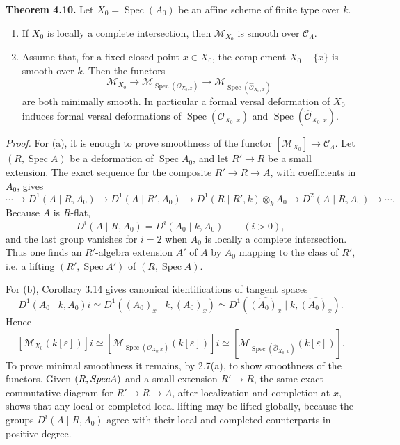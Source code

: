 \documentclass[11pt]{article}
\providecommand{\Spec}{\operatorname{Spec}}
\begin{document}
\textbf{Theorem 4.10.} Let \(X_0=\Spec(A_0)\) be an affine scheme of finite type over \(k\).
\begin{enumerate}[label=(\alph*)]
\item If \(X_0\) is locally a complete intersection, then \(\mathcal M_{X_0}\) is smooth over \(\mathcal C_\Lambda\).
\item Assume that, for a fixed closed point \(x\in X_0\), the complement \(X_0-\{x\}\) is smooth over \(k\). Then the functors
\[
 \mathcal M_{X_0}\longrightarrow \mathcal M_{\Spec(\mathcal O_{X_0,x})}
 \longrightarrow \mathcal M_{\Spec(\widehat{\mathcal O}_{X_0,x})}
\]
are both minimally smooth. In particular a formal versal deformation of \(X_0\) induces formal versal deformations of \(\Spec(\mathcal O_{X_0,x})\) and \(\Spec(\widehat{\mathcal O}_{X_0,x})\).
\end{enumerate}
\textit{Proof.}  For (a), it is enough to prove smoothness of the functor \([\mathcal M_{X_0}]\to\mathcal C_\Lambda\). Let \((R,\Spec A)\) be a deformation of \(\Spec A_0\), and let \(R'\to R\) be a small extension. The exact sequence for the composite \(R'\to R\to A\), with coefficients in \(A_0\), gives
\[
 \cdots\to D^1(A\mid R,A_0)\to D^1(A\mid R',A_0)\to
 D^1(R\mid R',k)\otimes_k A_0\to D^2(A\mid R,A_0)\to\cdots .
\]
Because \(A\) is \(R\)-flat,
\[
 D^i(A\mid R,A_0)=D^i(A_0\mid k,A_0)\qquad (i>0),
\]
and the last group vanishes for \(i=2\) when \(A_0\) is locally a complete intersection. Thus one finds an \(R'\)-algebra extension \(A'\) of \(A\) by \(A_0\) mapping to the class of \(R'\), i.e. a lifting \((R',\Spec A')\) of \((R,\Spec A)\).

For (b), Corollary 3.14 gives canonical identifications of tangent spaces
\[
 D^1(A_0\mid k,A_0)
i \simeq D^1((A_0)_x\mid k,(A_0)_x)
 \simeq D^1(\widehat{(A_0)_x}\mid k,\widehat{(A_0)_x}).
\]
Hence
\[
 [\mathcal M_{X_0}(k[\varepsilon])]
i\simeq
 [\mathcal M_{\Spec(\mathcal O_{X_0,x})}(k[\varepsilon])]
i\simeq
 [\mathcal M_{\Spec(\widehat{\mathcal O}_{X_0,x})}(k[\varepsilon])].
\]
To prove minimal smoothness it remains, by 2.7(a), to show smoothness of the functors. Given \((R,\\Spec A)\) and a small extension \(R'\to R\), the same exact commutative diagram for \(R'\to R\to A\), after localization and completion at \(x\), shows that any local or completed local lifting may be lifted globally, because the groups \(D^i(A\mid R,A_0)\) agree with their local and completed counterparts in positive degree.
\end{document}
